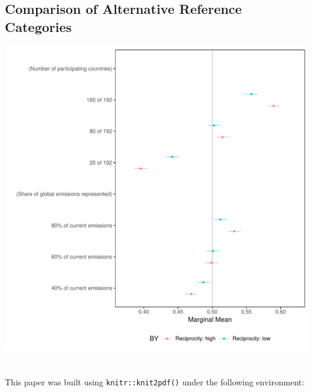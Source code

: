 \documentclass[a4paper,12pt]{article}\usepackage[]{graphicx}\usepackage[]{color}
\makeatletter
\def\maxwidth{ %
  \ifdim\Gin@nat@width>\linewidth
    \linewidth
  \else
    \Gin@nat@width
  \fi
}
\newenvironment{knitrout}{}{} %
\makeatother
\begin{document}
\clearpage


\subsection{Comparison of Alternative Reference Categories}


\begin{knitrout}
\color{fgcolor}
\includegraphics[width=\maxwidth]{figure/bechtel_reciprocity_reference-1} 

\end{knitrout}

\clearpage


\section*{}

\noindent This paper was built using \texttt{knitr::knit2pdf()} under the following environment:
\end{document}
